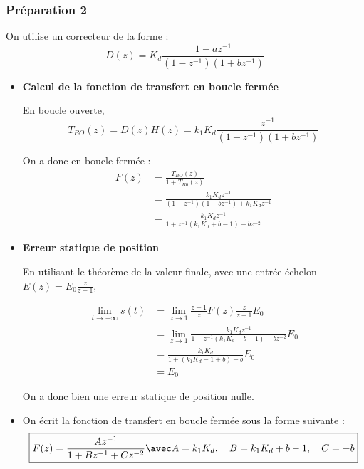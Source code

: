 \documentclass[../../Cours_M1.tex]{subfiles}
\newcommand{\z}{z^{-1}}
\begin{document}
\subsubsection*{Préparation 2}

On utilise un correcteur de la forme :
\[ D(z) = K_d\frac{1-a\z}{(1-\z)(1+b\z)} \]

\begin{itemize} \setlength{\itemsep}{10mm}
\item \textbf{Calcul de la fonction de transfert en boucle fermée }

En boucle ouverte,
\[ T_{BO}(z) = D(z)H(z) = k_1K_d \frac{\z}{(1-\z)(1+b\z)} \]

On a donc en boucle fermée :
\begin{align*}
F(z) & = \frac{T_{BO}(z)}{1+T_{B0}(z)} \\
& = \frac{k_1K_d\z}{(1-\z)(1+b\z) +k_1K_d\z} \\
& = \frac{k_1K_d\z}{1+\z(k_1K_d+b-1)-bz^{-2}}
\end{align*}

\item \textbf{Erreur statique de position}

En utilisant le théorème de la valeur finale, avec une entrée échelon $E(z) = E_0 \frac{z}{z-1}$,

\begin{align*}
\lim_{t\rightarrow +\infty}s(t) & = \lim_{z\rightarrow 1} \frac{z-1}{z} F(z) \frac{z}{z-1}E_0 \\
& = \lim_{z\rightarrow 1} \frac{k_1K_d\z}{1+\z(k_1K_d+b-1)-bz^{-2}} E_0 \\
& = \frac{k_1K_d}{1+(k_1K_d-1+b)-b}E_0 \\
& = E_0
\end{align*}

On a donc bien une erreur statique de position nulle.

\item On écrit la fonction de transfert en boucle fermée sous la forme suivante :
\[ \boxed{ F(z) = \frac{A\z}{1+B\z+Cz^{-2}} \avec A = k_1K_d, \quad B=k_1K_d + b -1, \quad C = -b }\]
\end{itemize}
\end{document}
